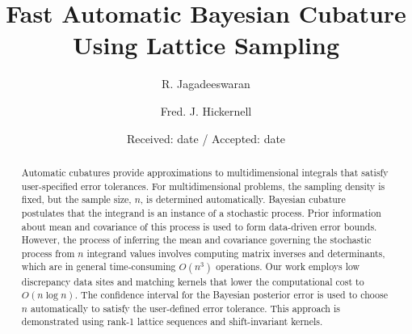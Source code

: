 \documentclass[twocolumn]{svjour3}          %
\begin{document}
\setlength\abovedisplayskip{1pt}
\setlength{\belowdisplayskip}{1pt}

\title{Fast Automatic Bayesian Cubature Using Lattice Sampling
}
%



\author{R. Jagadeeswaran         \and
        Fred. J. Hickernell %
}



\date{Received: date / Accepted: date}

\maketitle

\begin{abstract}
Automatic cubatures provide approximations to multidimensional integrals that satisfy user-specified error tolerances.  For multidimensional problems, the sampling density is fixed, but the
sample size, $n$, is determined automatically. Bayesian cubature postulates that the integrand is an instance of a stochastic process.
Prior information about mean and covariance of this process is used to form data-driven error bounds.  However, the process of inferring the mean and covariance governing the stochastic process from $n$ integrand values involves computing matrix inverses and determinants,
which are in general time-consuming $O(n^3)$ operations.
Our work employs low discrepancy data sites and matching kernels that lower the  computational cost to $O(n \log n)$.  The confidence interval for the Bayesian posterior error is used to choose $n$ automatically to satisfy the user-defined error tolerance.  This approach is demonstrated using rank-1 lattice sequences and shift-invariant kernels.


\end{abstract}
\end{document}
